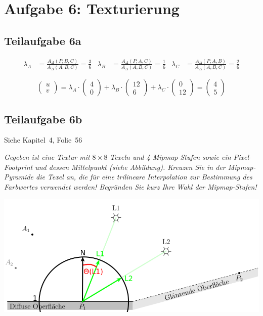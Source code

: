 \documentclass[a4paper]{scrartcl}
\begin{document}
\section*{Aufgabe 6: Texturierung}
\subsection*{Teilaufgabe 6a}
\begin{align}
    \lambda_A &= \frac{A_\Delta(P,B,C)}{A_\Delta(A,B,C)} = \frac{3}{6}
    &\lambda_B &= \frac{A_\Delta(P,A,C)}{A_\Delta(A,B,C)} = \frac{1}{6}
    &\lambda_C &= \frac{A_\Delta(P,A,B)}{A_\Delta(A,B,C)} = \frac{2}{6}
\end{align}

\begin{equation}
\begin{pmatrix}u\\v\end{pmatrix} = \lambda_A \cdot \begin{pmatrix}4\\0\end{pmatrix} + \lambda_B \cdot \begin{pmatrix}12\\6\end{pmatrix} + \lambda_C \cdot \begin{pmatrix}0\\12\end{pmatrix} = \begin{pmatrix}4\\5\end{pmatrix}
\end{equation}


\subsection*{Teilaufgabe 6b}
Siehe Kapitel~4, Folie~56

\textit{Gegeben ist eine Textur mit $8\times8$ Texeln und 4 Mipmap-Stufen sowie ein
Pixel-Footprint und dessen Mittelpunkt (siehe Abbildung). Kreuzen Sie in der
Mipmap-Pyramide die Texel an, die für eine trilineare Interpolation zur
Bestimmung des Farbwertes verwendet werden! Begründen Sie kurz Ihre Wahl der
Mipmap-Stufen!}

\includegraphics*[width=0.8\linewidth, keepaspectratio]{1a.png}
\end{document}
